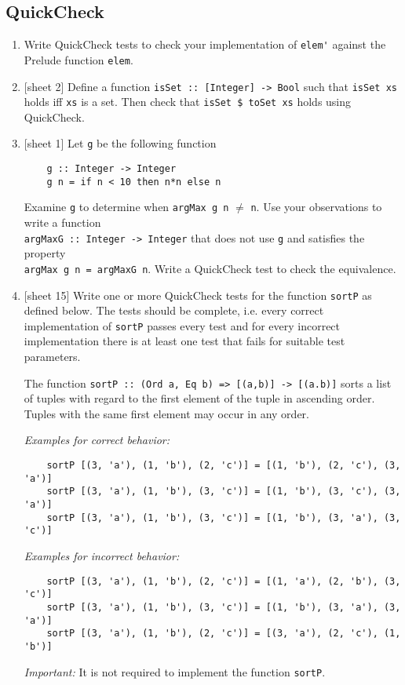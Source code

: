 \documentclass{article}
\begin{document}
\subsection{QuickCheck}
\begin{enumerate}
\item Write QuickCheck tests to check your implementation of \verb|elem'| against the Prelude function \verb|elem|.

\item {[sheet 2]} Define a function \verb|isSet :: [Integer] -> Bool| such that \verb|isSet xs| holds iff \verb|xs| is a set. Then check that \verb|isSet $ toSet xs| holds using QuickCheck.

\item {[sheet 1]} Let \verb|g| be the following function
\begin{verbatim}
    g :: Integer -> Integer
    g n = if n < 10 then n*n else n
\end{verbatim}
Examine \verb|g| to determine when \verb|argMax g n| $\neq$ \verb|n|. Use your observations to write a function \\ \verb|argMaxG :: Integer -> Integer| that does not use \verb|g| and satisfies the property \\ \verb|argMax g n = argMaxG n|. Write a QuickCheck test to check the equivalence.

\item {[sheet 15]} Write one or more QuickCheck tests for the function \verb|sortP| as defined below. The tests should be complete, i.e. every correct implementation of \verb|sortP| passes every test and for every incorrect implementation there is at least one test that fails for suitable test parameters. \par
The function \verb|sortP :: (Ord a, Eq b) => [(a,b)] -> [(a.b)]| sorts a list of tuples with regard to the first element of the tuple in ascending order. Tuples with the same first element may occur in any order. \par
\textit{Examples for correct behavior:}
\begin{verbatim}
    sortP [(3, 'a'), (1, 'b'), (2, 'c')] = [(1, 'b'), (2, 'c'), (3, 'a')]
    sortP [(3, 'a'), (1, 'b'), (3, 'c')] = [(1, 'b'), (3, 'c'), (3, 'a')]
    sortP [(3, 'a'), (1, 'b'), (3, 'c')] = [(1, 'b'), (3, 'a'), (3, 'c')]
\end{verbatim}
\textit{Examples for incorrect behavior:}
\begin{verbatim}
    sortP [(3, 'a'), (1, 'b'), (2, 'c')] = [(1, 'a'), (2, 'b'), (3, 'c')]
    sortP [(3, 'a'), (1, 'b'), (3, 'c')] = [(1, 'b'), (3, 'a'), (3, 'a')]
    sortP [(3, 'a'), (1, 'b'), (2, 'c')] = [(3, 'a'), (2, 'c'), (1, 'b')]
\end{verbatim}
\textit{Important:} It is not required to implement the function \verb|sortP|.


\end{enumerate}
\end{document}
